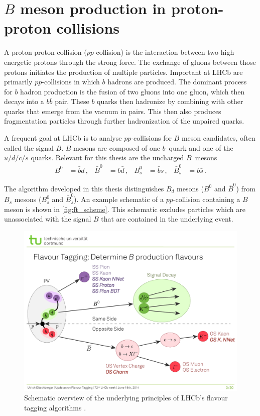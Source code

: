 \section{\texorpdfstring{$B$}{B} meson production in proton-proton collisions} %
\label{sec:B_mesons}

A proton-proton collision ($pp$-collision) is the interaction between two high energetic protons through the strong force.
The exchange of gluons between those protons initiates the production of multiple particles. 
Important at LHCb are primarily $pp$-collisions in which $b$ hadrons are produced.
The dominant process for $b$ hadron production is the fusion of two gluons into one gluon, which then decays into a $b\bar{b}$ pair.
These $b$ quarks then hadronize by combining with other quarks that emerge from the vacuum in pairs. %
This then also produces fragmentation particles through further hadronization of the unpaired quarks.

A frequent goal at LHCb is to analyse $pp$-collisions for $B$ meson candidates, often called the signal $B$. %
$B$ mesons are composed of one $b$~quark and one of the $u/d/c/s$ quarks.
Relevant for this thesis are the uncharged $B$~mesons
\begin{align*}
    B^0 &= \bar{b}d \, , & \bar{B}^0 &= b\bar{d} \, , & B_s^0 &= \bar{b}s \, , & \bar{B}_s^0 &= b\bar{s} \, .
\end{align*}

The algorithm developed in this thesis distinguishes $B_d$ mesons ($B^0$ and $\bar{B}^0$) from $B_s$ mesons ($B_s^0$ and $\bar{B}_s^0$).
An example schematic of a $pp$-collision containing a $B$ meson is shown in \autoref{fig:ft_scheme}. 
This schematic excludes particles which are unassociated with the signal $B$ that are contained in the underlying event.

\begin{figure}
    \centering
    \includegraphics[width=\textwidth]{images/FlavourTaggingScheme.pdf}
    \caption{Schematic overview of the underlying principles of LHCb's flavour tagging algorithms \cite{ft_scheme}.}
    \label{fig:ft_scheme}
\end{figure}

